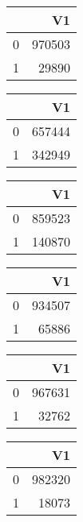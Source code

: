 \bigskip\bigskip
\centering
\begin{tabular}{rr}
  \hline
 & V1 \\ 
  \hline
0 & 970503 \\ 
  1 & 29890 \\ 
   \hline
\end{tabular}

\bigskip\bigskip
\centering
\begin{tabular}{rr}
  \hline
 & V1 \\ 
  \hline
0 & 657444 \\ 
  1 & 342949 \\ 
   \hline
\end{tabular}

\bigskip\bigskip
\centering
\begin{tabular}{rr}
  \hline
 & V1 \\ 
  \hline
0 & 859523 \\ 
  1 & 140870 \\ 
   \hline
\end{tabular}

\bigskip\bigskip
\centering
\begin{tabular}{rr}
  \hline
 & V1 \\ 
  \hline
0 & 934507 \\ 
  1 & 65886 \\ 
   \hline
\end{tabular}

\bigskip\bigskip
\centering
\begin{tabular}{rr}
  \hline
 & V1 \\ 
  \hline
0 & 967631 \\ 
  1 & 32762 \\ 
   \hline
\end{tabular}

\bigskip\bigskip
\centering
\begin{tabular}{rr}
  \hline
 & V1 \\ 
  \hline
0 & 982320 \\ 
  1 & 18073 \\ 
   \hline
\end{tabular}

